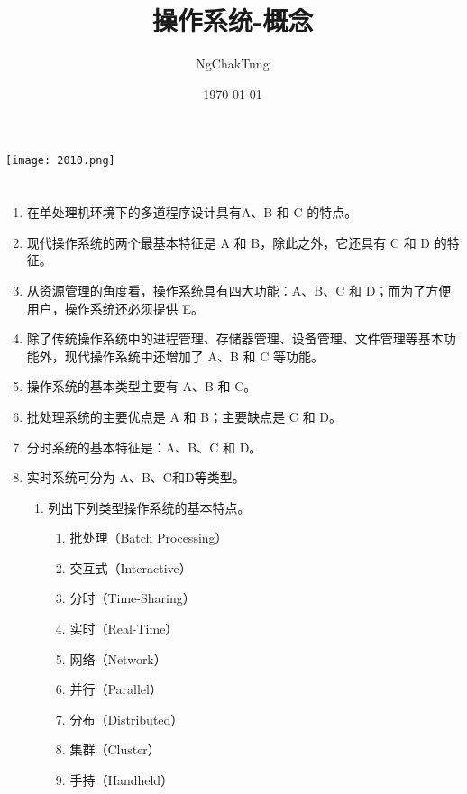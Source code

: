 \documentclass[UTF8]{ctexart}
\title{操作系统-概念}
\author{NgChakTung}
\date{\today}
\begin{document}
\maketitle
\centering
\texttt{[image: 2010.png]}
\section{}

\begin{enumerate}
	
	\item 在单处理机环境下的多道程序设计具有A、B 和 C 的特点。
	
	\item 现代操作系统的两个最基本特征是 A 和 B，除此之外，它还具有 C 和 D 的特征。
	
	\item 从资源管理的角度看，操作系统具有四大功能：A、B、C 和 D；而为了方便用户，操作系统还必须提供 E。
	
	\item 除了传统操作系统中的进程管理、存储器管理、设备管理、文件管理等基本功能外，现代操作系统中还增加了 A、B 和 C 等功能。
	
	\item 操作系统的基本类型主要有 A、B 和 C。
	
	\item 批处理系统的主要优点是 A 和 B；主要缺点是 C 和 D。
	
	\item 分时系统的基本特征是：A、B、C 和 D。
	
	\item 实时系统可分为 A、B、C和D等类型。
	
	\begin{enumerate}
		\item 列出下列类型操作系统的基本特点。
		\begin{enumerate}
			\item 批处理（Batch Processing）
			\item 交互式（Interactive）
			\item 分时（Time-Sharing）
			\item 实时（Real-Time）
			\item 网络（Network）
			\item 并行（Parallel）
			\item 分布（Distributed）
			\item 集群（Cluster）
			\item 手持（Handheld）
		\end{enumerate}
	\end{enumerate}
\end{enumerate}
\end{document}
